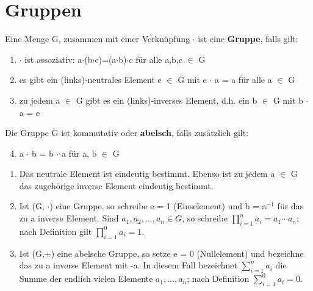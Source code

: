 %


\section{Gruppen}
\begin{definition}
Eine Menge G, zusammen mit einer Verknüpfung $\cdot$ ist eine \textbf{Gruppe}, falls gilt:
\begin{enumerate}
\item $\cdot$ ist assoziativ: a$\cdot$(b$\cdot$c)=(a$\cdot$b)$\cdot$c für alle a,b,c $\in$ G
\item es gibt ein (links)-neutrales Element e $\in$ G mit e $\cdot$ a = a für alle a $\in$ G 
\item zu jedem a $\in$ G gibt es ein (links)-inverses Element, d.h. ein b $\in$ G mit b $\cdot$ a = e
\end{enumerate}
\hspace*{3mm} Die Gruppe G ist kommutativ oder \textbf{abelsch}, falls zusätzlich gilt:
\begin{enumerate}
\setcounter{enumi}{3}
\item a $\cdot$ b = b $\cdot$ a für a, b $\in$ G
\end{enumerate}
\end{definition}

\begin{remark}
\begin{enumerate}
\item Das neutrale Element ist eindeutig bestimmt. Ebenso ist zu jedem a $\in$ G das zugehörige inverse Element eindeutig bestimmt.
\item Ist (G, $\cdot$) eine Gruppe, so schreibe e = 1 (Einselement) und b = a$^{-1}$ für das zu a inverse Element. Sind $a_1, a_2, . . . , a_n \in G$, so schreibe $\prod\nolimits_{i=1}^{n} a_i = a_1 \cdots a_n$; nach Definition gilt $\prod\nolimits_{i=1}^{0}a_i = 1$.
\item Ist (G,+) eine abelsche Gruppe, so setze e = 0 (Nullelement) und bezeichne das zu a inverse Element mit -a. In diesem Fall bezeichnet $\sum\nolimits_{i=1}^{n} a_i$ die Summe der endlich vielen Elemente $a_1, . . . , a_n$; nach Definition $\sum\nolimits_{i=1}^{0} a_i = 0$.
\end{enumerate}
\end{remark}

